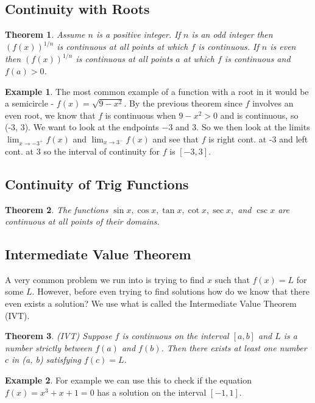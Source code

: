 \documentclass[12pt,reqno]{article}
\newtheorem{Theorem}{Theorem}
\theoremstyle{definition}
\newtheorem*{Example}{Example}
\begin{document}
\subsection{Continuity with Roots} 
\begin{Theorem}
	Assume $n$ is a positive integer. If $n$ is an odd integer then $(f(x))^{1/n}$ is continuous at all points at which $f$ is continuous. If $n$ is even then $(f(x))^{1/n}$ is continuous at all points $a$ at which $f$ is continuous and $f(a) > 0$.
\end{Theorem}

\begin{Example}
	The most common example of a function with a root in it would be a semicircle - $f(x) = \sqrt{9 - x^2}$. By the previous theorem since $f$ involves an even root, we know that $f$ is continuous when $9 - x^2 > 0$ and is continuous, so (-3, 3). We want to look at the endpoints $-3$ and $3$. So we then look at the limits $\lim_{x\to -3^+} f(x)$ and $\lim_{x\to 3^-} f(x)$ and see that $f$ is right cont. at -3 and left cont. at 3 so the interval of continuity for $f$ is $[-3, 3]$. 
\end{Example}
\subsection{Continuity of Trig Functions} 
\begin{Theorem}
	The functions $\sin x, \cos x, \tan x, \cot x, \sec x,$ and $\csc x$ are continuous at all points of their domains. 
\end{Theorem}

\subsection{Intermediate Value Theorem} 
A very common problem we run into is trying to find $x$ such that $f(x) = L$ for some $L$. However, before even trying to find solutions how do we know that there even exists a solution?  We use what is called the Intermediate Value Theorem (IVT). 
\begin{Theorem}
	(IVT) Suppose $f$ is continuous on the interval $[a, b]$ and $L$ is a number strictly between $f(a)$ and $f(b)$. Then there exists at least one number $c$ in (a, b) satisfying $f(c) = L$. 
\end{Theorem}
\begin{Example}
For example we can use this to check if the equation $f(x) = x^3 + x + 1 = 0$ has a solution on the interval $[-1, 1]$. 
\end{Example}
\end{document}
